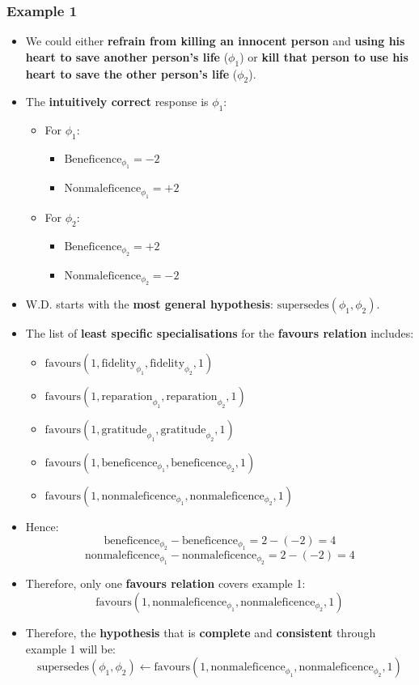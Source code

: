 \documentclass[11pt]{article}
\begin{document}
 \newpage
\subsubsection{Example 1}
\label{sec:org7338030}
\begin{itemize}
\item We could either \textbf{refrain from killing an innocent person} and \textbf{using his heart to save another person's life} (\(\phi_1\)) or \textbf{kill that person to use his heart to save the other person's life} (\(\phi_2\)).
\item The \textbf{intuitively correct} response is \(\phi_1\):
\begin{itemize}
\item For \(\phi_1\):
\begin{itemize}
\item \(\text{Beneficence}_{\phi_1} = - 2\)
\item \(\text{Nonmaleficence}_{\phi_1} = + 2\)
\end{itemize}
\item For \(\phi_2\):
\begin{itemize}
\item \(\text{Beneficence}_{\phi_2} = + 2\)
\item \(\text{Nonmaleficence}_{\phi_2} = - 2\)
\end{itemize}
\end{itemize}
\item W.D. starts with the \textbf{most general hypothesis}: \(\text{supersedes}(\phi_1, \phi_2)\).
\item The list of \textbf{least specific specialisations} for the \textbf{favours relation} includes:
\begin{itemize}
\item \(\text{favours}(1, \text{fidelity}_{\phi_1}, \text{fidelity}_{\phi_2}, 1)\)
\item \(\text{favours}(1, \text{reparation}_{\phi_1}, \text{reparation}_{\phi_2}, 1)\)
\item \(\text{favours}(1, \text{gratitude}_{\phi_1}, \text{gratitude}_{\phi_2}, 1)\)
\item \(\text{favours}(1, \text{beneficence}_{\phi_1}, \text{beneficence}_{\phi_2}, 1)\)
\item \(\text{favours}(1, \text{nonmaleficence}_{\phi_1}, \text{nonmaleficence}_{\phi_2}, 1)\)
\end{itemize}
\item Hence:
\[\text{beneficence}_{\phi_2} - \text{beneficence}_{\phi_1} = 2 - (-2) = 4\]
\[\text{nonmaleficence}_{\phi_1} - \text{nonmaleficence}_{\phi_2} = 2 - (-2) = 4\]
\item Therefore, only one \textbf{favours relation} covers example 1:
\[\text{favours}(1, \text{nonmaleficence}_{\phi_1}, \text{nonmaleficence}_{\phi_2}, 1)\]
\item Therefore, the \textbf{hypothesis} that is \textbf{complete} and \textbf{consistent} through example 1 will be:
\[\text{supersedes}(\phi_1, \phi_2) \leftarrow \text{favours}(1, \text{nonmaleficence}_{\phi_1}, \text{nonmaleficence}_{\phi_2}, 1)\]
\end{itemize}
\end{document}
